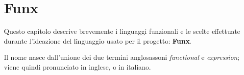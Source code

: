 \chapter{Funx}
\label{chap:2-funx}

Questo capitolo descrive brevemente i linguaggi funzionali e le scelte effettuate
durante l'ideazione del linguaggio usato per il progetto: \textbf{Funx}.

\noindent Il nome nasce dall'unione dei due termini anglosassoni \textit{functional} e \textit{expression};
viene quindi pronunciato \textipa{["f2nIk"s]} in inglese,
 o  in italiano.





\newpage



